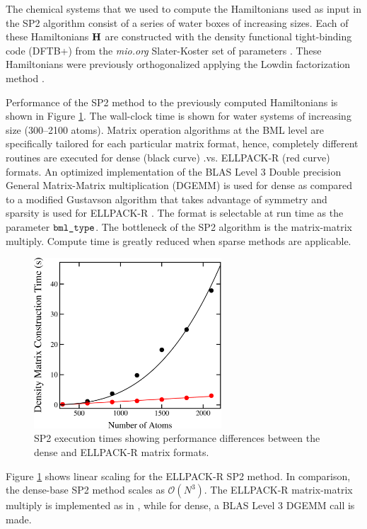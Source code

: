 The chemical systems that we used to compute the Hamiltonians used as input in the SP2 algorithm consist of a series of water boxes of increasing sizes. Each of these Hamiltonians $\textbf{H}$ are constructed with the density functional tight-binding code (DFTB+)\cite{Aradi2007} from the \textit{mio.org} Slater-Koster set of parameters \cite{Slater1954,Elstner1998}. These Hamiltonians were previously orthogonalized applying the Lowdin factorization method \cite{Lowdin56,Negre2016}.

Performance of the SP2 method to the previously computed Hamiltonians is shown in Figure \ref{ellvsdense}. The wall-clock time is shown for water systems of increasing size (300--2100 atoms). Matrix operation algorithms at the BML level are specifically tailored for each particular matrix format, hence, completely different routines are executed for dense (black curve) .vs. ELLPACK-R (red curve) formats. An optimized implementation of the BLAS Level 3 Double precision General Matrix-Matrix multiplication (DGEMM) is used for dense as compared to a modified Gustavson algorithm \cite{FGustavson78} that takes advantage of symmetry and sparsity is used for ELLPACK-R \cite{Mniszewski2015}.
The format is selectable at run time as the parameter $\texttt{bml\_type}$. The bottleneck of the SP2 algorithm is the matrix-matrix multiply.
Compute time is greatly reduced when sparse methods are applicable.
%

  \begin{figure}
  \begin{center}
    \includegraphics[width=7.0cm]{./fig/times.pdf}
    \caption{SP2 execution times showing performance differences between the dense and ELLPACK-R matrix formats.}
    \label{ellvsdense}
    \end{center}
  \end{figure} 

%
Figure \ref{ellvsdense} shows linear scaling for the ELLPACK-R SP2 method. In comparison, the dense-base SP2 method scales as $\mathcal{O}(N^3)$. The ELLPACK-R matrix-matrix multiply is implemented as in \cite{Mniszewski2015}, while for dense, a BLAS Level 3 DGEMM call is made.

